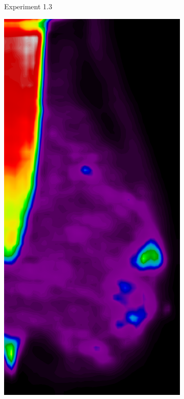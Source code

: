 \begin{figure}[h!]
\begin{subfigure}{0.195\textwidth}
		\caption{Experiment 1.3}
    \end{subfigure}
	\begin{subfigure}{0.195\textwidth}
		\centering
			\includegraphics[width=\textwidth]{plots/examples/example1_probs_2.png}

\end{subfigure}
\end{figure}
